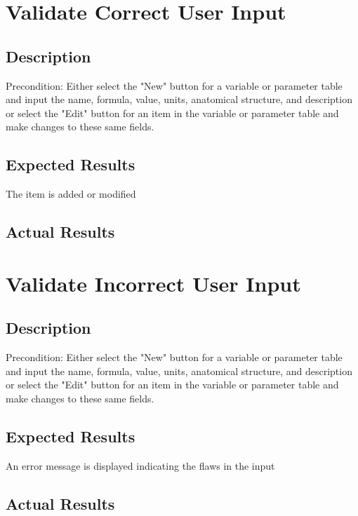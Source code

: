\documentclass{article}
\begin{document}
\section{Validate Correct User Input}
\subsection{Description}
Precondition: Either select the "New" button for a variable or parameter table and input the name, formula, value, units, anatomical structure, and description or select the "Edit" button for an item in the variable or parameter table and make changes to these same fields.
\subsection{Expected Results}
The item is added or modified
\subsection{Actual Results}

\section{Validate Incorrect User Input}
\subsection{Description}
Precondition: Either select the "New" button for a variable or parameter table and input the name, formula, value, units, anatomical structure, and description or select the "Edit" button for an item in the variable or parameter table and make changes to these same fields.
\subsection{Expected Results}
An error message is displayed indicating the flaws in the input
\subsection{Actual Results}
\end{document}
